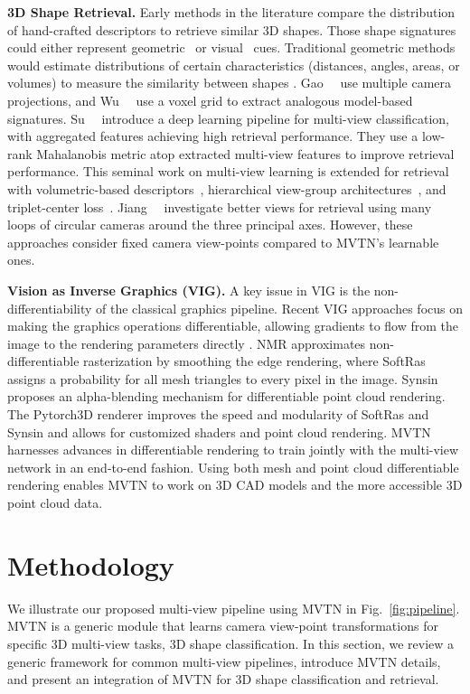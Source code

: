 \documentclass[10pt,twocolumn,letterpaper]{article}
\newcommand{\figLabel}{Fig.~}
\newcommand{\mysection}[1]{\noindent\textbf{#1.}}
\begin{document}
\mysection{3D Shape Retrieval}
Early methods in the literature compare the distribution of hand-crafted descriptors to retrieve similar 3D shapes. Those shape signatures could either represent geometric~\cite{osada2002shape} or visual~\cite{chen2003visual} cues. Traditional geometric methods would estimate distributions of certain characteristics (\eg distances, angles, areas, or volumes) to measure the similarity between shapes \cite{akgul20093d,chaudhuri2010data,bronstein2011shape}.
Gao~\etal~\cite{gao2011camera} use multiple camera projections, and Wu~\etal~\cite{wu20153d} use a voxel grid to extract analogous model-based signatures. Su~\etal~\cite{mvcnn} introduce a deep learning pipeline for multi-view classification, with aggregated features achieving high retrieval performance. They use a low-rank Mahalanobis metric atop extracted multi-view features to improve retrieval performance. This seminal work on multi-view learning is extended for retrieval with
volumetric-based descriptors~\cite{qi2016volumetric},
hierarchical view-group architectures~\cite{mvgvcnn}, and 
triplet-center loss~\cite{he2018triplet}.
Jiang~\etal~\cite{mlvcnn} investigate better views for retrieval using many loops of circular cameras around the three principal axes.
However, these approaches consider fixed camera view-points compared to MVTN's learnable ones.

\mysection{Vision as Inverse Graphics (VIG)}
A key issue in VIG is the non-differentiability of the classical graphics pipeline. 
Recent VIG approaches focus on making the graphics operations differentiable, allowing gradients to flow from the image to the rendering parameters directly \cite{vig-open-dr,vig-nmr,soft-rasterizer,vig-monte-carlo-raytrace,semantic-robustness}.
NMR \cite{vig-nmr} approximates non-differentiable rasterization by smoothing the edge rendering, where SoftRas \cite{soft-rasterizer} assigns a probability for all mesh triangles to every pixel in the image. Synsin \cite{synsin} proposes an alpha-blending mechanism for differentiable point cloud rendering. The Pytorch3D \cite{pytorch3d} renderer improves the speed and modularity of SoftRas and Synsin and allows for customized shaders and point cloud rendering. MVTN harnesses advances in differentiable rendering to train jointly with the multi-view network in an end-to-end fashion. 
Using both mesh and point cloud differentiable rendering enables MVTN to work on 3D CAD models and the more accessible 3D point cloud data.


\section{Methodology} \label{sec:methodology}
We illustrate our proposed multi-view pipeline using MVTN in \figLabel{\ref{fig:pipeline}}. MVTN is a generic module that learns camera view-point transformations for specific 3D multi-view tasks, \eg 3D shape classification. In this section, we review a generic framework for common multi-view pipelines, introduce MVTN details, and present an integration of MVTN for 3D shape classification and retrieval.
\end{document}
